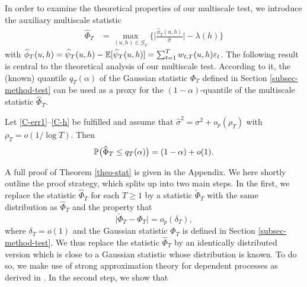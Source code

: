 In order to examine the theoretical properties of our multiscale test, we introduce the auxiliary multiscale statistic 
\begin{align}
\widehat{\Phi}_T 
 & = \max_{(u,h) \in \mathcal{G}_T} \Big\{ \Big| \frac{\widehat{\phi}_T(u,h)}{\widehat{\sigma}} \Big| - \lambda(h) \Big\} \label{Phi-hat-statistic}
\end{align}
with $\widehat{\phi}_T(u,h) = \widehat{\psi}_T(u,h) - \mathbb{E} [\widehat{\psi}_T(u,h)] = \sum\nolimits_{t=1}^T w_{t,T}(u,h) \varepsilon_t$. The following result is central to the theoretical analysis of our multiscale test. According to it, the (known) quantile $q_T(\alpha)$ of the Gaussian statistic $\Phi_T$ defined in Section \ref{subsec-method-test} can be used as a proxy for the $(1-\alpha)$-quantile of the multiscale statistic $\widehat{\Phi}_T$.
\begin{theorem}\label{theo-stat}
Let \ref{C-err1}--\ref{C-h} be fulfilled and assume that $\widehat{\sigma}^2 = \sigma^2 + o_p(\rho_T)$ with $\rho_T = o(1/\log T)$. Then 
\[ \mathbb{P} \big( \widehat{\Phi}_T \le q_T(\alpha) \big) = (1 - \alpha) + o(1). \]
\end{theorem}
A full proof of Theorem \ref{theo-stat} is given in the Appendix. 
We here shortly outline the proof strategy, which splits up into two main steps. 
In the first, we replace the statistic $\widehat{\Phi}_T$ for each $T \ge 1$ by a statistic $\widetilde{\Phi}_T$ with the same distribution as $\widehat{\Phi}_T$ and the property that 
\begin{equation}\label{eq-theo-stat-strategy-step1}
\big| \widetilde{\Phi}_T - \Phi_T \big| = o_p(\delta_T),
\end{equation}
where $\delta_T = o(1)$ and the Gaussian statistic $\Phi_T$ is defined in Section \ref{subsec-method-test}. We thus replace the statistic $\widehat{\Phi}_T$ by an identically distributed version which is close to a Gaussian statistic whose distribution is known. To do so, we make use of strong approximation theory for dependent processes as derived in \cite{BerkesLiuWu2014}. In the second step, we show that 
